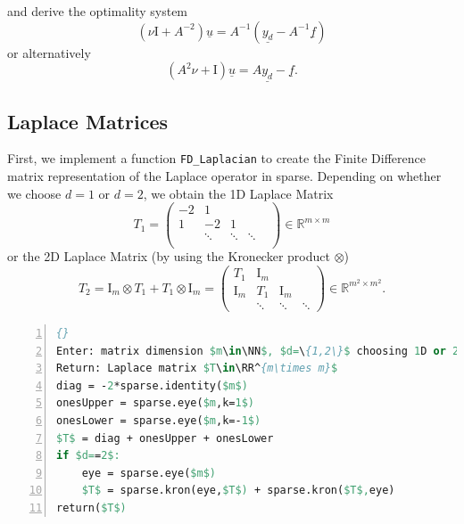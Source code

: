 \documentclass{amsart}
\theoremstyle{definition}
\theoremstyle{remark}
\numberwithin{equation}{section}
\newcommand{\RR}{\mathbb{R}}
\newcommand{\NN}{\mathbb{N}}
\begin{document}
and derive the optimality system
\begin{equation}
\left(\nu\text{I}+A^{-2}\right) \underline{u} =A^{-1}\left(\underline{y_d}-A^{-1}\underline{f}\right) \label{eq:normalOptimalitySystem}
\end{equation}
or alternatively
\begin{equation}
\left(A^2\nu+\text{I}\right) \underline{u} =A\underline{y_d}-\underline{f}. \label{eq:factoredOptimalitySystem}
\end{equation}


\subsection{Laplace Matrices}
First, we implement a function \texttt{FD\_Laplacian} to create the Finite Difference matrix representation of the Laplace operator in sparse.
Depending on whether we choose $d=1$ or $d=2$, we obtain the 1D Laplace Matrix 
$$ T_1 = 
\begin{pmatrix}
-2 & 1 & & & \\
1 & -2 & 1 & & \\
& \ddots & \ddots & \ddots & \\
\end{pmatrix} \in\RR^{m\times m}
$$
or the 2D Laplace Matrix (by using the Kronecker product $\otimes$)
$$ T_2 = \text{I}_m \otimes T_1 + T_1 \otimes \text{I}_m= 
\begin{pmatrix}
T_1 & \text{I}_m & & \\
\text{I}_m & T_1 & \text{I}_m & \\
& \ddots & \ddots & \ddots
\end{pmatrix} \in\RR^{m^2\times m^2}.
$$

\begin{lstlisting}[mathescape, language=Pascal, title=FD\_Laplacian,
frame=single, numbers=left, numberstyle=\tiny, tabsize=2,
morekeywords={Enter, Return, elif}, deletekeywords={of,or}, keywordstyle=\bfseries]{}
Enter: matrix dimension $m\in\NN$, $d=\{1,2\}$ choosing 1D or 2D
Return: Laplace matrix $T\in\RR^{m\times m}$
diag = -2*sparse.identity($m$)
onesUpper = sparse.eye($m,k=1$)
onesLower = sparse.eye($m,k=-1$)
$T$ = diag + onesUpper + onesLower
if $d==2$:
	eye = sparse.eye($m$)
	$T$ = sparse.kron(eye,$T$) + sparse.kron($T$,eye)
return($T$)
\end{lstlisting}
\end{document}
